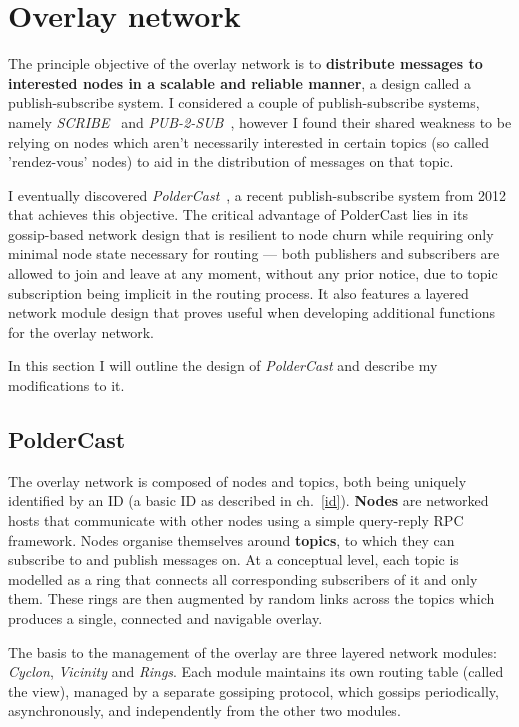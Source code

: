 \documentclass[10pt,a4paper,onecolumn]{article}
\begin{document}
\section{Overlay network}
\label{network}
The principle objective of the overlay network is to \textbf{distribute messages to interested nodes in a scalable and reliable manner}, a design called a publish-subscribe system. I considered a couple of publish-subscribe systems, namely \textit{SCRIBE}~\cite{scribe} and \textit{PUB-2-SUB}~\cite{pub2sub}, however I found their shared weakness to be relying on nodes which aren't necessarily interested in certain topics (so called 'rendez-vous' nodes) to aid in the distribution of messages on that topic.

I eventually discovered \textit{PolderCast}~\cite{poldercast}, a recent publish-subscribe system from 2012 that achieves this objective. The critical advantage of PolderCast lies in its gossip-based network design that is resilient to node churn while requiring only minimal node state necessary for routing — both publishers and subscribers are allowed to join and leave at any moment, without any prior notice, due to topic subscription being implicit in the routing process. It also features a layered network module design that proves useful when developing additional functions for the overlay network.

In this section I will outline the design of \textit{PolderCast} and describe my modifications to it.

\subsection{PolderCast}
The overlay network is composed of nodes and topics, both being uniquely identified by an ID (a basic ID as described in ch.~\ref{id}). \textbf{Nodes} are networked hosts that communicate with other nodes using a simple query-reply RPC framework. Nodes organise themselves around \textbf{topics}, to which they can subscribe to and publish messages on. At a conceptual level, each topic is modelled as a ring that connects all corresponding subscribers of it and only them. These rings are then augmented by random links across the topics which produces a single, connected and navigable overlay. 

The basis to the management of the overlay are three layered network modules: \emph{Cyclon}, \emph{Vicinity} and \emph{Rings}. Each module maintains its own routing table (called the view), managed by a separate gossiping protocol, which gossips periodically, asynchronously, and independently from the other two modules.
\end{document}
